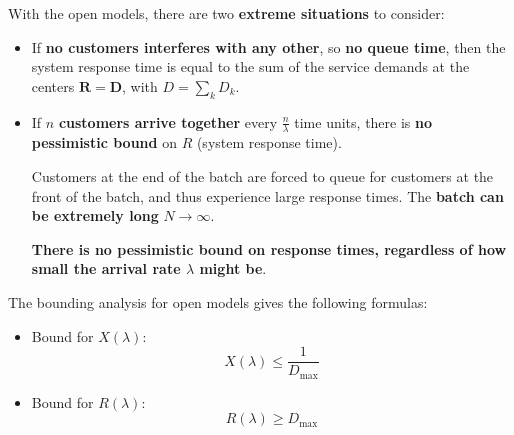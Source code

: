 \highspace
With the open models, there are two \textbf{extreme situations} to consider:
\begin{itemize}
	\item If \textbf{no customers interferes with any other}, so \textbf{no queue time}, then the system response time is equal to the sum of the service demands at the centers $\mathbf{R=D}$, with $D = \displaystyle\sum_{k}D_{k}$.
	
	\item If $n$ \textbf{customers arrive together} every $\frac{n}{\lambda}$ time units, there is \textbf{no pessimistic bound} on $R$ (system response time).
	
	Customers at the end of the batch are forced to queue for customers at the front of the batch, and thus experience large response times. The \textbf{batch can be extremely long} $N \rightarrow \infty$.
	
	\textbf{There is no pessimistic bound on response times, regardless of how small the arrival rate $\lambda$ might be}.
\end{itemize}
The bounding analysis for open models gives the following formulas:
\begin{itemize}
	\item Bound for $X\left(\lambda\right)$:
	\begin{equation}
		X\left(\lambda\right) \le \dfrac{1}{D_{\max}}
	\end{equation}
	
	\item Bound for $R\left(\lambda\right)$:
	\begin{equation}
		R\left(\lambda\right) \ge D_{\max}
	\end{equation}
\end{itemize}